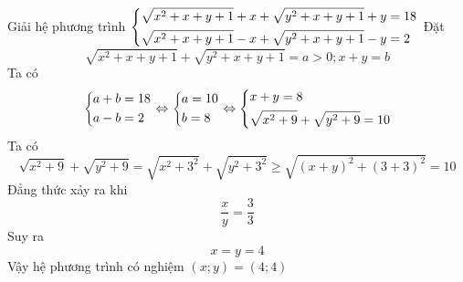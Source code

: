 \begin{ex}%
Giải hệ phương trình $\left\{\begin{aligned}&\sqrt{x^2+x+y+1}+x+\sqrt{y^2+x+y+1}+y=18 \\ &\sqrt{x^2+x+y+1}-x+\sqrt{y^2+x+y+1}-y=2\end{aligned}\right.$
\loigiai
{ Đặt 
$$\sqrt{x^2+x+y+1}+\sqrt{y^2+x+y+1}=a >0;x+y=b$$
Ta có 
$$\left\{\begin{aligned}&a+b=18\\&a-b=2\end{aligned}\right. \Leftrightarrow \left\{\begin{aligned}&a=10\\&b =8\end{aligned}\right. \Leftrightarrow \left\{\begin{aligned}&x+y=8\\ &\sqrt{x^2+9}+ \sqrt{y^2+9}=10\end{aligned}\right.$$
Ta có
$$\sqrt{x^2+9}+ \sqrt{y^2+9}=\sqrt{x^2+3^2}+ \sqrt{y^2+3^2} \geq \sqrt{(x+y)^2+(3+3)^2}=10$$
Đẳng thức xảy ra khi $$\dfrac{x}{y}=\dfrac{3}{3}$$
Suy ra $$x=y=4$$
Vậy hệ phương trình có nghiệm $(x;y)=(4;4)$
}
\end{ex}


